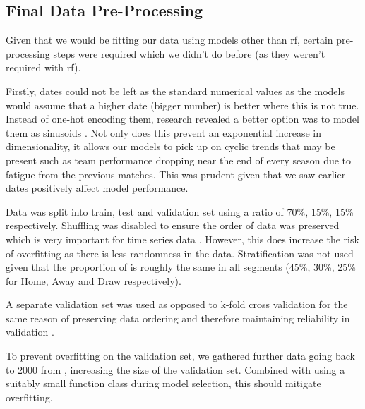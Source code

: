 \documentclass{article}
\begin{document}
\subsection{Final Data Pre-Processing}
\label{finaldata}

Given that we would be fitting our data using models other than \gls{rf}, certain pre-processing steps were required which we didn’t do before (as they weren’t required with \gls{rf}).  

Firstly, dates could not be left as the standard numerical values as the models would assume that a higher date (bigger number) is better where this is not true. Instead of one-hot encoding them, research revealed a better option was to model them as sinusoids \cite{kumarmediumonehot}. Not only does this prevent an exponential increase in dimensionality, it allows our models to pick up on cyclic trends that may be present such as team performance dropping near the end of every season due to fatigue from the previous matches. This was prudent given that we saw earlier dates positively affect model performance.

Data was split into train, test and validation set using a ratio of 70\%, 15\%, 15\% respectively. Shuffling was disabled to ensure the order of data was preserved which is very important for time series data \cite{horvat2020use}. However, this does increase the risk of overfitting as there is less randomness in the data. Stratification was not used given that the proportion of is roughly the same in all segments (45\%, 30\%, 25\% for Home, Away and Draw respectively).  

A separate validation set was used as opposed to k-fold cross validation for the same reason of preserving data ordering and therefore maintaining reliability in validation \cite{horvat2020use, fialho2019predicting}.  

To prevent overfitting on the validation set, we gathered further data going back to 2000 from \cite{footballdata}, increasing the size of the validation set. Combined with using a suitably small function class during model selection, this should mitigate overfitting. 
\end{document}
